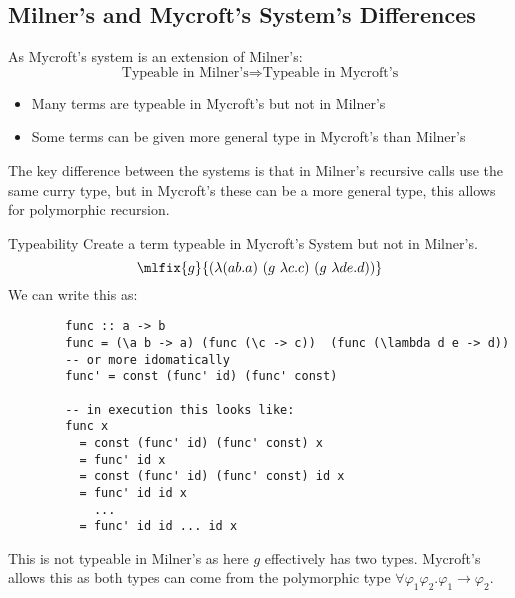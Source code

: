 \subsection{Milner's and Mycroft's System's Differences}
As Mycroft's system is an extension of Milner's:
\[\text{Typeable in Milner's} \Rightarrow \text{Typeable in Mycroft's}\]
\begin{itemize}
    \item Many terms are typeable in Mycroft's but not in Milner's
    \item Some terms can be given more general type in Mycroft's than Milner's
\end{itemize}
The key difference between the systems is that in Milner's recursive calls use the same curry type, but in Mycroft's these can be a more general type, this allows for polymorphic recursion.
\begin{examplebox}{Typeability}
    Create a term typeable in Mycroft's System but not in Milner's.
    \tcblower
    \[\mlfix{g}{(\lambda (ab.a) \ (g \ \lambda c . c) \ (g \ \lambda de.d ))}\]
    We can write this as:
    \begin{verbatim}
        func :: a -> b
        func = (\a b -> a) (func (\c -> c))  (func (\lambda d e -> d))
        -- or more idomatically
        func' = const (func' id) (func' const)
        
        -- in execution this looks like:
        func x
          = const (func' id) (func' const) x
          = func' id x
          = const (func' id) (func' const) id x
          = func' id id x
            ...
          = func' id id ... id x
    \end{verbatim}
    This is not typeable in Milner's as here $g$ effectively has two types. Mycroft's allows this as both types can come from the polymorphic type $\forall \varphi_1 \varphi_2 . \varphi_1 \to \varphi_2$.
\end{examplebox}
